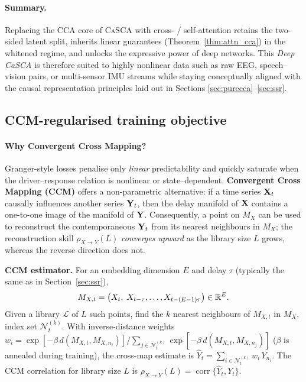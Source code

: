 \documentclass[14pt]{extarticle}
\begin{document}
	\paragraph{Summary.}
	Replacing the CCA core of \textsc{CaSCA} with cross- / self-attention
	retains the two-sided latent split, inherits linear guarantees
	(Theorem~\ref{thm:attn_cca}) in the whitened regime, and unlocks the
	expressive power of deep networks.
	This \emph{Deep CaSCA} is therefore suited to highly nonlinear data
	such as raw EEG, speech–vision pairs, or multi-sensor IMU streams while
	staying conceptually aligned with the causal representation principles
	laid out in Sections \ref{sec:purecca}–\ref{sec:ssr}.
	
	\subsection{CCM-regularised training objective}
	\label{sec:ccm_reg}
	
	\paragraph{Why Convergent Cross Mapping?}
	Granger-style losses penalise only \emph{linear} predictability and
	quickly saturate when the driver–response relation is nonlinear or
	state–dependent.
	\textbf{Convergent Cross Mapping (CCM)} \citep{Sugihara2012} offers a
	non-parametric alternative: if a time series
	$\mathbf{X}_t$ causally influences another series $\mathbf{Y}_t$, then the delay
	manifold of $\mathbf{X}$ contains a one-to-one image of the manifold of $\mathbf{Y}$.
	Consequently, a point on $M_X$ can be used to reconstruct the
	contemporaneous $\mathbf{Y}_t$ from its nearest neighbours in $M_X$;
	the reconstruction skill
	$\rho_{X\to Y}(L)$ \emph{converges upward} as the library size
	$L$ grows, whereas the reverse direction does not.
	
	\vspace{0.2em}
	\noindent\textbf{CCM estimator.}
	For an embedding dimension $E$ and delay $\tau$ (typically the same as
	in Section~\ref{sec:ssr}),
	\[
	M_{X,t}
	=\bigl(X_t,\;X_{t-\tau},\dots,X_{t-(E-1)\tau}\bigr)\in\mathbb{R}^{E}.
	\]
	Given a library $\mathcal L$ of $L$ such points,
	find the $k$ nearest neighbours of $M_{X,t}$ in $M_X$,
	index set $\mathcal N_t^{(k)}$.
	With inverse-distance weights
	$
	w_i=\exp[-\beta\,d(M_{X,t},M_{X,n_i})]\big/\!\!\sum_{j\in\mathcal N_t^{(k)}}\exp[-\beta\,d(M_{X,t},M_{X,n_j})]
	$
	($\beta$ is annealed during training),
	the cross-map estimate is
	$
	\widehat{Y}_t=\sum_{i\in\mathcal N_t^{(k)}}w_i\,Y_{n_i}.
	$
	The CCM correlation for library size $L$ is
	$\rho_{X\to Y}(L)=\operatorname{corr}\!\bigl\{\widehat{Y}_t,Y_t\bigr\}.$
	
\end{document}
